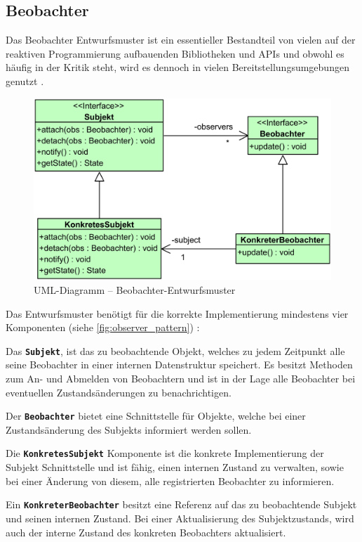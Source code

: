 \subsection{Beobachter}
Das Beobachter Entwurfsmuster ist ein essentieller Bestandteil von vielen auf der reaktiven Programmierung aufbauenden Bibliotheken und APIs \cite{Salvaneschi2015} und obwohl es häufig in der Kritik steht, wird es dennoch in vielen Bereitstellungsumgebungen genutzt \cite{Maier2010}.
\begin{figure}[H]
	\includegraphics[width=\textwidth]{Abbildungen/Observer Pattern.png}
	\caption{UML-Diagramm -- Beobachter-Entwurfsmuster}
	\label{fig:observer_pattern}
\end{figure}
\noindent Das Entwurfsmuster benötigt für die korrekte Implementierung mindestens vier Komponenten (siehe \autoref{fig:observer_pattern}) \cite{Gamma1993}:
\begin{description}
	\item Das \texttt{\textbf{Subjekt}}, ist das zu beobachtende Objekt, welches zu jedem Zeitpunkt alle seine Beobachter in einer internen Datenstruktur speichert. Es besitzt Methoden zum An- und Abmelden von Beobachtern und ist in der Lage alle Beobachter bei eventuellen Zustandsänderungen zu benachrichtigen.
	\item Der \texttt{\textbf{Beobachter}} bietet eine Schnittstelle für Objekte, welche bei einer Zustandsänderung des Subjekts informiert werden sollen.
	\item Die \texttt{\textbf{KonkretesSubjekt}} Komponente ist die konkrete Implementierung der Subjekt Schnittstelle und ist fähig, einen internen Zustand zu verwalten, sowie bei einer Änderung von diesem, alle registrierten Beobachter zu informieren.
	\item Ein \texttt{\textbf{KonkreterBeobachter}} besitzt eine Referenz auf das zu beobachtende Subjekt und seinen internen Zustand. Bei einer Aktualisierung des Subjektzustands, wird auch der interne Zustand des konkreten Beobachters aktualisiert.
\end{description}
